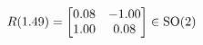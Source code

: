 \documentclass[preview]{standalone}
\begin{document}
\begin{align*}
\special{dvisvgm:raw <g id='unique000'>}R(1.49) = \begin{bmatrix} 0.08 & -1.00 \\ 1.00 & 0.08 \end{bmatrix} \in \text{SO}(2)\special{dvisvgm:raw </g>}
\end{align*}
\end{document}
